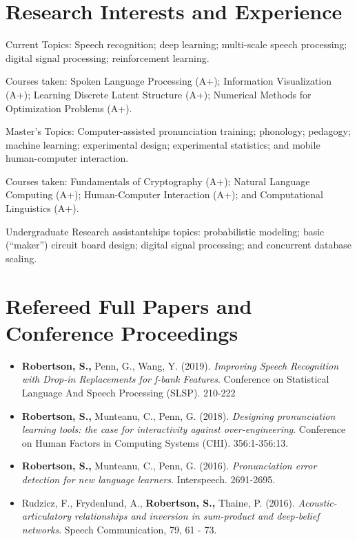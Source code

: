 \documentclass{article}
\begin{document}
\section{Research Interests and Experience}
\begin{CV}
  \item[Current] Topics: Speech recognition; deep learning; multi-scale
    speech processing; digital signal processing; reinforcement learning.

    Courses taken: Spoken Language Processing (A+);
    Information Visualization (A+);
    Learning Discrete Latent Structure (A+);
    Numerical Methods for Optimization Problems (A+).

  \item[Master's] Topics: Computer-assisted pronunciation training;
    phonology; pedagogy; machine learning; experimental design; experimental
    statistics; and mobile human-computer interaction.

    Courses taken: Fundamentals of Cryptography (A+); Natural Language
    Computing (A+); Human-Computer Interaction (A+); and Computational
    Linguistics (A+).

  \item[Undergraduate] Research assistantships topics: probabilistic modeling;
    basic (``maker'') circuit board design; digital signal processing; and
    concurrent database scaling.

\end{CV}

\section{Refereed Full Papers and Conference Proceedings}
\begin{itemize}
  \item \textbf{Robertson, S.,} Penn, G., Wang, Y. (2019).
    \textit{Improving Speech Recognition with Drop-in Replacements for f-bank
    Features}. Conference on Statistical Language And Speech Processing
    (SLSP). 210-222

  \item \textbf{Robertson, S.,} Munteanu, C., Penn, G. (2018).
    \textit{Designing pronunciation learning tools: the case for interactivity
    against over-engineering}. Conference on Human Factors in Computing Systems
    (CHI). 356:1-356:13.

  \item \textbf{Robertson, S.,} Munteanu, C., Penn, G. (2016).
    \textit{Pronunciation error detection for new language learners}.
    Interspeech. 2691-2695.

  \item Rudzicz, F., Frydenlund, A., \textbf{Robertson, S.,} Thaine, P. (2016).
    \textit{Acoustic-articulatory relationships and inversion in sum-product
    and deep-belief networks}. Speech Communication, 79, 61 - 73.
\end{itemize}
\end{document}
